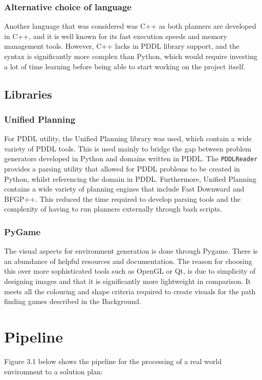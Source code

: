 \subsubsection{Alternative choice of language}
Another language that was considered was C++ as both planners are developed in C++, and it is well known for its fast execution speeds and memory management tools.\cite{noauthor_why_2023} However, C++ lacks in PDDL library support, and the syntax is significantly more complex than Python, which would require investing a lot of time learning before being able to start working on the project itself.

\subsection{Libraries}
\subsubsection{Unified Planning}
For PDDL utility, the Unified Planning library was used, which contain a wide variety of PDDL tools. This is used mainly to bridge the gap between problem generators developed in Python and domains written in PDDL. The \texttt{PDDLReader} provides a parsing utility that allowed for PDDL problems to be created in Python, whilst referencing the domain in PDDL. Furthermore, Unified Planning contains a wide variety of planning engines that include Fast Downward and BFGP++. This reduced the time required to develop parsing tools and the complexity of having to run planners externally through bash scripts. 

\subsubsection{PyGame}
The visual aspects for environment generation is done through Pygame. There is an abundance of helpful resources and documentation. The reason for choosing this over more sophisticated tools such as OpenGL or Qt, is due to simplicity of designing images and that it is significantly more lightweight in comparison. It meets all the colouring and shape criteria required to create visuals for the path finding games described in the Background.

\section{Pipeline}
Figure 3.1 below shows the pipeline for the processing of a real world environment to a solution plan:

